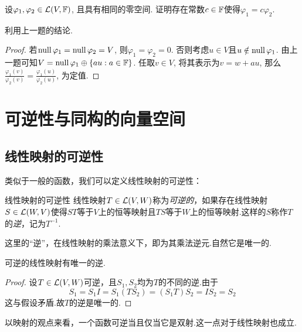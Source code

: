 \begin{exercise} %
	设$\varphi _1,\varphi _2 \in \mathcal{L} (V,\mathbb{F})$, 且具有相同的零空间. 证明存在常数$c \in \mathbb{F}$使得$\varphi _1 = c\varphi _2$. 
\end{exercise}
\begin{hint}
	利用上一题的结论. 
\end{hint}
\begin{proof}
	若$\operatorname{null} \varphi _1=\operatorname{null} \varphi _2=V$, 则$\varphi _1 = \varphi _2=0$. 否则考虑$u\in V$且$u \notin \operatorname{null} \varphi _1$. 由上一题可知$V = \operatorname{null} \varphi _1 \oplus \{ au:a \in \mathbb{F} \}$. 任取$v \in V$, 将其表示为$v = w + au$, 那么$\frac{\varphi _1(v)}{\varphi _2(v)} = \frac{\varphi _1(u)}{\varphi _2(u)}$, 为定值. 
\end{proof}

\newpage
\section{可逆性与同构的向量空间}

\subsection{线性映射的可逆性}

类似于一般的函数，我们可以定义线性映射的可逆性：

\begin{definition}{线性映射的可逆性}
	线性映射$T \in \mathcal{L} (V,W)$称为\textit{可逆的}，如果存在线性映射$S \in \mathcal{L} (W,V)$使得$ST$等于$V$上的恒等映射且$TS$等于$W$上的恒等映射.这样的$S$称作$T$的\textit{逆}，记为$T^{-1}$.
\end{definition}

这里的“逆”，在线性映射的乘法意义下，即为其乘法逆元.自然它是唯一的.

\begin{proposition}{}
	可逆的线性映射有唯一的逆.
\end{proposition}
\begin{proof}
	设$T \in \mathcal{L} (V,W)$可逆，且$S_1,S_2$均为$T$的不同的逆.由于$$S_1 = S_1I = S_1(TS_2) = (S_1T)S_2 = IS_2 = S_2$$
	这与假设矛盾.故$T$的逆是唯一的.
\end{proof}

以映射的观点来看，一个函数可逆当且仅当它是双射.这一点对于线性映射也成立.

